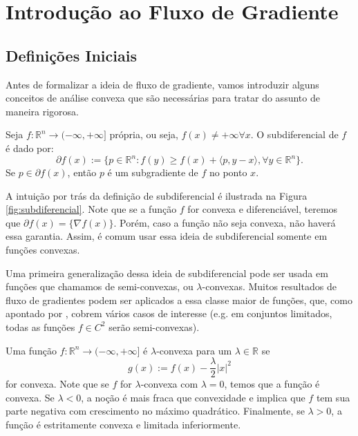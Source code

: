 \section{Introdução ao Fluxo de Gradiente}

\subsection{Definições Iniciais}

Antes de formalizar a ideia de fluxo de gradiente, vamos introduzir alguns
conceitos de análise convexa que são necessárias para tratar
do assunto de maneira rigorosa.

\begin{definition}[Subdiferencial]
    Seja $f:\mathbb R^n \to (-\infty, +\infty]$ própria, ou seja, $f(x) \neq +\infty \forall x$.
    O subdiferencial de $f$ é dado por:
    \begin{equation}
        \partial f(x) := \{p \in \mathbb R^n:
        f(y) \geq f(x) + \langle p, y-x\rangle, \forall y \in \mathbb R^n
        \}.
    \end{equation}
    Se $p \in \partial f(x)$, então $p$ é um subgradiente de $f$ no ponto $x$.
\end{definition}
A intuição por trás da definição
de subdiferencial é ilustrada na Figura \ref{fig:subdiferencial}.
Note que se a função $f$ for convexa e diferenciável, teremos que $\partial f(x) = \{\nabla f(x)\}$.
Porém, caso a função não seja convexa, não haverá essa garantia. Assim, é comum usar essa ideia de
subdiferencial somente em funções convexas.

Uma primeira generalização dessa ideia de subdiferencial pode ser usada em funções que chamamos
de semi-convexas, ou $\lambda$-convexas. Muitos resultados de fluxo de gradientes podem ser
aplicados a essa classe maior de funções, que, como apontado por \citet{santambrogio2017euclidean},
cobrem vários casos de interesse (e.g. em conjuntos limitados,
todas as funções $f \in C^2$ serão semi-convexas).

\begin{definition}
    Uma função $f:\mathbb R^n \to (-\infty,+\infty]$ é $\lambda$-convexa
    para um $\lambda\in\mathbb R$ se
    \begin{equation}
        g(x):=f(x) -\frac{\lambda}{2}|x|^2
    \end{equation}
    for convexa.
    Note que se $f$ for $\lambda$-convexa com $\lambda =0$, temos que a função é convexa.
    Se $\lambda <0$, a noção é mais fraca que convexidade e implica que
    $f$ tem sua parte negativa com crescimento no máximo quadrático.
    Finalmente, se $\lambda > 0$, a função é estritamente convexa e
    limitada inferiormente.
\end{definition}

